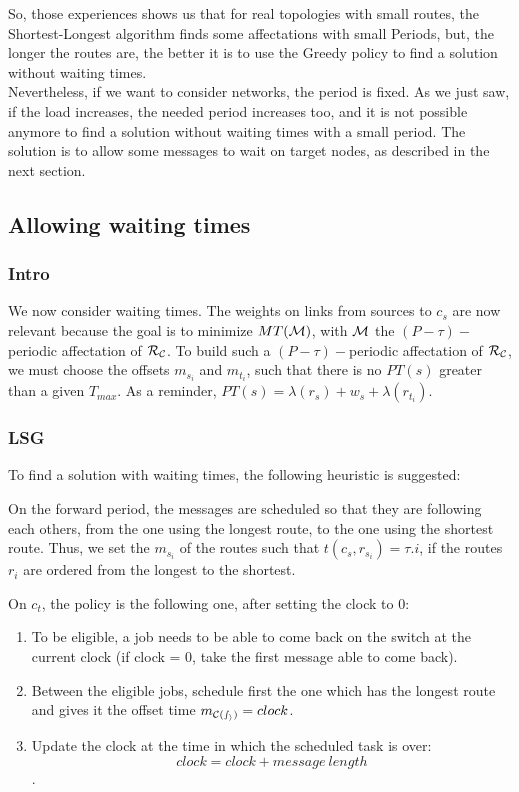 \documentclass[a4paper,10pt]{article}
\begin{document}
      So, those experiences shows us that for real topologies with small routes, the Shortest-Longest algorithm finds some affectations with small Periods, but, the longer the routes are, the better it is to use the Greedy policy to find a solution without waiting times.\\
      Nevertheless, if we want to consider networks, the period is fixed. As we just saw, if the load increases, the needed period increases too, and it is not possible anymore to find a solution without waiting times with a small period. The solution is to allow some messages to wait on target nodes, as described in the next section.
      
   \subsection{Allowing waiting times}
   
     \subsubsection{Intro}
	  We now consider waiting times. The weights on links from sources to $c_s$ are now relevant because the goal is to minimize $MT({\cal M})$, with ${\cal M}$ the $(P-\tau)-$periodic affectation of ${\cal R_{\cal C}}$.
	  To build such a $(P-\tau)-$periodic affectation of ${\cal R_{\cal C}}$, we must choose the offsets $m_{s_i}$ and $m_{t_i}$, such that there is no $PT(s)$ greater than a given $T_{max}$.
	  As a reminder, $ PT(s)=\lambda(r_s)+ w_s+\lambda(r_{t_i})$.
     \subsubsection{LSG}
     

To find a solution with waiting times, the following heuristic is suggested:

On the forward period, the messages are scheduled so that they are following each others, from the one using the longest route, to the one using the shortest route. Thus, we set the $m_{s_i}$ of the routes such that  $t(c_s,r_{s_i}) = \tau.i$, if the routes $r_i$ are ordered from the longest to the shortest.

On $c_t$, the policy is the following one, after setting the clock to 0:
\begin{enumerate}
 \item To be eligible, a job needs to be able to come back on the switch at the current clock (if clock = 0, take the first message able to come back).
 \item Between the eligible jobs, schedule first the one which has the longest route and gives it the offset time $m_{\cal C(s_i)} = clock$.
 \item Update the clock at the time in which the scheduled task is over: $$clock = clock + message\ length$$.
\end{enumerate}
\end{document}
